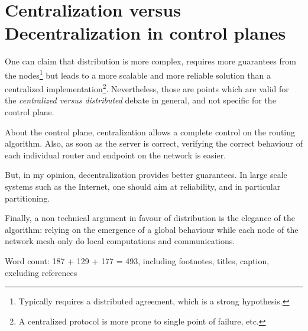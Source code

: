 \documentclass[twocolumn]{article}
\begin{document}
\section{Centralization versus Decentralization in control planes}
One can claim that distribution is more complex, requires more guarantees from the nodes\footnote{Typically requires a distributed agreement, which is a strong hypothesis.} but leads to a more scalable and more reliable solution than a centralized implementation\footnote{A centralized protocol is more prone to single point of failure, etc.}. Nevertheless, those are points which are valid for the \emph{centralized versus distributed} debate in general, and not specific for the control plane.

About the control plane, centralization allows a complete control on the routing algorithm. Also, as soon as the server is correct, verifying the correct behaviour of each individual router and endpoint on the network is easier.

But, in my opinion, decentralization provides better guarantees. In large scale systems such as the Internet, one should aim at reliability, and in particular partitioning.

Finally, a non technical argument in favour of distribution is the elegance of the algorithm: relying on the emergence of a global behaviour while each node of the network mesh only do local computations and communications.

\vfill
{\color{gray} \noindent Word count: 187 + 129 + 177 = 493, including footnotes, titles, caption, excluding references}
\end{document}
